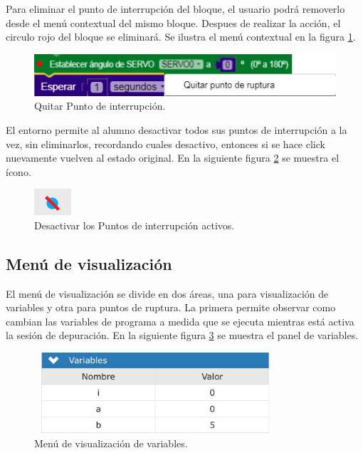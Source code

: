 Para eliminar el punto de interrupción del bloque, el usuario podrá removerlo desde el menú contextual del mismo bloque. Despues de realizar la acción, el circulo rojo del bloque se eliminará. Se ilustra el menú contextual en la figura \ref{fig:breakpoint-eliminar}.

\begin{figure}[!htbp]
	\centering
	\includegraphics[scale=.65]{./Figures/breakpoint-eliminar.PNG}
	\caption{Quitar Punto de interrupción.}
	\label{fig:breakpoint-eliminar}
\end{figure}

El entorno permite al alumno desactivar todos sus puntos de interrupción a la vez, sin eliminarlos, recordando cuales desactivo, entonces si se hace click nuevamente vuelven al estado original.
En la siguiente figura \ref{fig:desactivar-breakpoints} se muestra el ícono.

\begin{figure}[!htbp]
	\begin{center}  %
		\includegraphics[scale=.80]{./Figures/desactivar-breakpoints.PNG}
		\par\caption{Desactivar los Puntos de interrupción activos.}\label{fig:desactivar-breakpoints}
	\end{center}
\end{figure}

\subsection{Menú de visualización}
\label{subsec:Iniciar/Menú de visualización}

El menú de visualización se divide en dos áreas, una para visualización de variables y otra para puntos de ruptura. La primera permite observar como cambian las variables de programa a medida que se ejecuta mientras está activa la sesión de depuración. En la siguiente figura \ref{fig:ventana-variables} se muestra el panel de variables.

\begin{figure}[!htbp]
	\centering
	\includegraphics*[width=9cm,height=3cm]{./Figures/variables.PNG}
	\caption{Menú de visualización de variables.}
	\par\label{fig:ventana-variables}
\end{figure}

